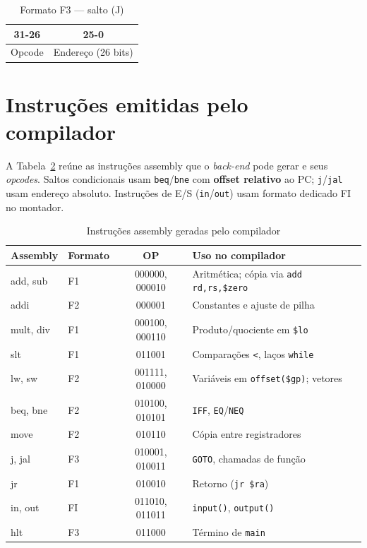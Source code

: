 \documentclass[
	12pt,				%
	openright,			%
	a4paper,			%
	english,			%
	french,				%
	spanish,			%
	brazil,				%
	]{abntex2}
\begin{document}
\begin{table}[H]
\centering
\caption{Formato F3 --- salto (J)}
\label{tab:formato-f3}
    \begin{tabular}{|c|c|}
     \hline
        31-26 & 25-0 \\
        \hline \hline
        Opcode & Endereço (26 bits) \\
     \hline
    \end{tabular}
\end{table}

\section{Instruções emitidas pelo compilador}

A Tabela~\ref{tab:conjunto-instrucoes} reúne as instruções assembly que o \emph{back-end} pode gerar e seus \emph{opcodes}. Saltos condicionais usam \texttt{beq}/\texttt{bne} com \textbf{offset relativo} ao PC; \texttt{j}/\texttt{jal} usam endereço absoluto. Instruções de E/S (\texttt{in}/\texttt{out}) usam formato dedicado FI no montador.

\begin{table}[H]
\centering
\caption{Instruções assembly geradas pelo compilador}
\label{tab:conjunto-instrucoes}
\small
    \begin{tabular}{|l|l|c|p{4.8cm}|}
     \hline
        \textbf{Assembly} & \textbf{Formato} & \textbf{OP} & \textbf{Uso no compilador} \\
        \hline \hline
        add, sub & F1 & 000000, 000010 & Aritmética; cópia via \texttt{add rd,rs,\$zero} \\
        addi & F2 & 000001 & Constantes e ajuste de pilha \\
        mult, div & F1 & 000100, 000110 & Produto/quociente em \texttt{\$lo} \\
        slt & F1 & 011001 & Comparações \texttt{<}, laços \texttt{while} \\
        lw, sw & F2 & 001111, 010000 & Variáveis em \texttt{offset(\$gp)}; vetores \\
        beq, bne & F2 & 010100, 010101 & \texttt{IFF}, \texttt{EQ}/\texttt{NEQ} \\
        move & F2 & 010110 & Cópia entre registradores \\
        j, jal & F3 & 010001, 010011 & \texttt{GOTO}, chamadas de função \\
        jr & F1 & 010010 & Retorno (\texttt{jr \$ra}) \\
        in, out & FI & 011010, 011011 & \texttt{input()}, \texttt{output()} \\
        hlt & F3 & 011000 & Término de \texttt{main} \\
     \hline
    \end{tabular}
\end{table}
\end{document}
